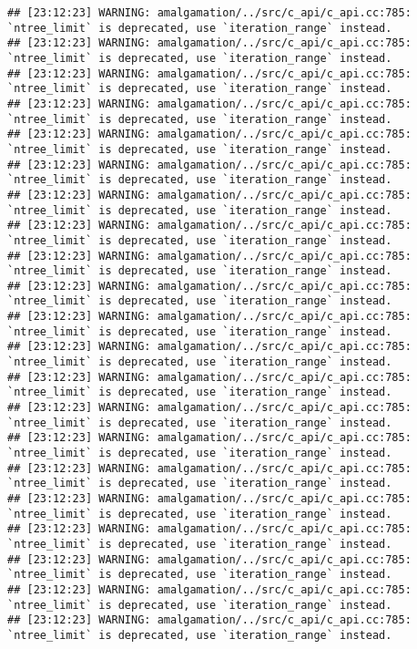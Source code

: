 \documentclass[
]{article}
\begin{document}
\begin{verbatim}
## [23:12:23] WARNING: amalgamation/../src/c_api/c_api.cc:785: `ntree_limit` is deprecated, use `iteration_range` instead.
## [23:12:23] WARNING: amalgamation/../src/c_api/c_api.cc:785: `ntree_limit` is deprecated, use `iteration_range` instead.
## [23:12:23] WARNING: amalgamation/../src/c_api/c_api.cc:785: `ntree_limit` is deprecated, use `iteration_range` instead.
## [23:12:23] WARNING: amalgamation/../src/c_api/c_api.cc:785: `ntree_limit` is deprecated, use `iteration_range` instead.
## [23:12:23] WARNING: amalgamation/../src/c_api/c_api.cc:785: `ntree_limit` is deprecated, use `iteration_range` instead.
## [23:12:23] WARNING: amalgamation/../src/c_api/c_api.cc:785: `ntree_limit` is deprecated, use `iteration_range` instead.
## [23:12:23] WARNING: amalgamation/../src/c_api/c_api.cc:785: `ntree_limit` is deprecated, use `iteration_range` instead.
## [23:12:23] WARNING: amalgamation/../src/c_api/c_api.cc:785: `ntree_limit` is deprecated, use `iteration_range` instead.
## [23:12:23] WARNING: amalgamation/../src/c_api/c_api.cc:785: `ntree_limit` is deprecated, use `iteration_range` instead.
## [23:12:23] WARNING: amalgamation/../src/c_api/c_api.cc:785: `ntree_limit` is deprecated, use `iteration_range` instead.
## [23:12:23] WARNING: amalgamation/../src/c_api/c_api.cc:785: `ntree_limit` is deprecated, use `iteration_range` instead.
## [23:12:23] WARNING: amalgamation/../src/c_api/c_api.cc:785: `ntree_limit` is deprecated, use `iteration_range` instead.
## [23:12:23] WARNING: amalgamation/../src/c_api/c_api.cc:785: `ntree_limit` is deprecated, use `iteration_range` instead.
## [23:12:23] WARNING: amalgamation/../src/c_api/c_api.cc:785: `ntree_limit` is deprecated, use `iteration_range` instead.
## [23:12:23] WARNING: amalgamation/../src/c_api/c_api.cc:785: `ntree_limit` is deprecated, use `iteration_range` instead.
## [23:12:23] WARNING: amalgamation/../src/c_api/c_api.cc:785: `ntree_limit` is deprecated, use `iteration_range` instead.
## [23:12:23] WARNING: amalgamation/../src/c_api/c_api.cc:785: `ntree_limit` is deprecated, use `iteration_range` instead.
## [23:12:23] WARNING: amalgamation/../src/c_api/c_api.cc:785: `ntree_limit` is deprecated, use `iteration_range` instead.
## [23:12:23] WARNING: amalgamation/../src/c_api/c_api.cc:785: `ntree_limit` is deprecated, use `iteration_range` instead.
## [23:12:23] WARNING: amalgamation/../src/c_api/c_api.cc:785: `ntree_limit` is deprecated, use `iteration_range` instead.
## [23:12:23] WARNING: amalgamation/../src/c_api/c_api.cc:785: `ntree_limit` is deprecated, use `iteration_range` instead.

\end{verbatim}
\end{document}
